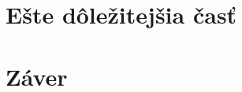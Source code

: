 \documentclass[10pt,twocolumn,twoside,slovak,a4paper]{article}
\begin{document}
\section{Ešte dôležitejšia časť} \label{dolezitejsia}




\section{Záver} \label{zaver} %






\end{document}
